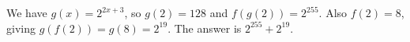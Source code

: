 We have $g(x)=2^{2x+3}$, so $g(2)=128$ and $f(g(2))=2^{255}$. Also $f(2)=8$, giving $g(f(2))=g(8)=2^{19}$. The answer is $\boxed{2^{255}+2^{19}}$.
